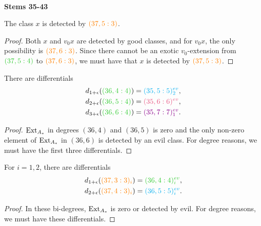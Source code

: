 \ \\
\noindent
{\bf Stems 35-43}

\begin{prop}\label{prop:detectx}
The class $x$ is detected by ${\color{orange}(37,5 : 3)}$.
\end{prop}
\begin{proof}
Both $x$ and $v_0x$ are detected by good classes, and for $v_0x$, the only possibility is  ${\color{orange}(37,6 : 3)}$. Since there cannot be an exotic $v_0$-extension from $ {\color{limegreen}(37,5 : 4)} $ to ${\color{orange}(37,6 : 3)}$, we must have that $x$ is detected by ${\color{orange}(37,5 : 3)}$.
\end{proof}


\begin{prop}
There are differentials
\begin{align*}
d_{1+\epsilon}({\color{limegreen}(36,4 : 4)}) &={\color{cyan}(35,5 : 5)_2^{ev}}, \\
d_{2+\epsilon}({\color{limegreen}(36,5 : 4)}) &={\color{lavenderrose}(35,6 : 6)^{ev}}, \\
d_{3+\epsilon}({\color{limegreen}(36,6 : 4)}) &={\color{darkmagenta}(35,7 : 7)_1^{ev}}.
\end{align*}
\end{prop}
\begin{proof}
$\operatorname{Ext}_{A_*}$ in degrees $(36,4 )$ and $(36,5)$ is zero and the only non-zero element of $\operatorname{Ext}_{A_*}$ in $(36,6)$ is detected by an evil class. For degree reasons, we must have the first three differentials.
\end{proof}



\begin{prop}
For $i = 1,2$, there are differentials
\begin{align*}
d_{1+\epsilon}({\color{orange}(37,3 : 3)_i}) &= {\color{limegreen}(36,4 : 4)_i^{ev}}, \\
 d_{2+\epsilon}({\color{orange}(37,4 : 3)_i}) &= {\color{cyan}(36,5 : 5)_i^{ev}}.
 \end{align*}
\end{prop}
\begin{proof}
In these bi-degrees, $\operatorname{Ext}_{A_*}$ is zero or detected by evil. For degree reasons, we must have these differentials.
\end{proof}

